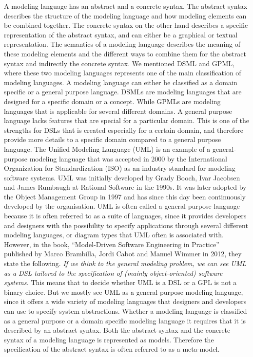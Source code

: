 A modeling language has an abstract and a concrete syntax. The abstract syntax
describes the structure of the modeling language and how modeling elements can
be combined together. The concrete syntax on the other hand describes a specific
representation of the abstract syntax, and can either be a graphical or
textual representation. The semantics of a modeling language describes the
meaning of these modeling elements and the different ways to combine them for
the abstract syntax and indirectly the concrete syntax. We mentioned DSML and
GPML, where these two modeling languages represents one of the main
classification of modeling languages. A modeling language can either be
classified as a domain specific or a general purpose language. DSMLs are
modeling languages that are designed for a specific domain or a concept. While
GPMLs are modeling languages that is applicable for several different domains.
A general purpose language lacks features that are special for a particular
domain. This is one of the strengths for DSLs that is created especially for a
certain domain, and therefore provide more details to a specific domain compared
to a general purpose language. The Unified Modeling Language\cite{UML_SPEC}
(UML) is an example of a general-purpose modeling language that
was accepted in 2000 by the International Organization for Standardization
(ISO) as an industry standard for modeling software systems. UML was initially
developed by Grady Booch, Ivar Jacobsen and James Rumbaugh at Rational Software
in the 1990s. It was later adopted by the Object Management Group in 1997 and
has since this day been continuously developed by the organisation. UML is
often called a general purpose language because it is often referred to as a
suite of languages, since it provides developers and designers with the possibility to
specify applications through several different modeling languages, or diagram
types that UML often is associated with. However, in the book, ``Model-Driven
Software Engineering in Practice'' published by Marco
Brambilla, Jordi Cabot and Manuel Wimmer in 2012, they state the following.
\textit{If we think to the general modeling problem, we can see UML as
a DSL tailored to the specification of (mainly object-oriented) software
systems\cite{Brambilla:MDSE}.} This means that to decide whether UML is a DSL or
a GPL is not a binary choice. But we mostly see UML as a general purpose
modeling language, since it offers a wide variety of modeling languages that
designers and developers can use to specify system abstractions. Whether a
modeling language is classified as a general purpose or a domain specific
modeling language it requires that it is described by an abstract syntax. Both
the abstract syntax and the concrete syntax of a modeling language is
represented as models. Therefore the specification of the abstract syntax is
often referred to as a meta-model. 

